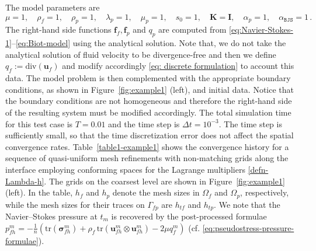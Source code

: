 \documentclass[11pt]{article}
\numberwithin{equation}{section}
\newcommand{\ds}{\displaystyle}
\newcommand{\bgamma}{{\boldsymbol\gamma}}
\newcommand{\bsi}{{\boldsymbol\sigma}}
\newcommand{\bvarphi}{{\boldsymbol\varphi}}
\newcommand{\btau}{{\boldsymbol\tau}}
\newcommand{\bv}{{\mathbf{v}}}
\newcommand{\f}{\mathbf{f}}
\newcommand{\bu}{\mathbf{u}}
\newcommand{\bn}{{\mathbf{n}}}
\newcommand{\0}{{\mathbf{0}}}
\def\bK{\mathbf{K}}
\def\bI{\mathbf{I}}
\def\bV{\mathbf{V}}
\newcommand\bbX{\mathbb{X}}
\def\BJS{\mathtt{BJS}}
\def\tr{\mathrm{tr}}
\def\div{\mathrm{div}}
\def\sk{\mathrm{sk}}
\numberwithin{equation}{section}
\begin{document}
The model parameters are
%
$$
\mu = 1, \quad \rho_f = 1,  \quad \rho_p = 1, \quad \lambda_p = 1, \quad \mu_p = 1, \quad s_0 = 1, \quad \bK = \bI, \quad \alpha_p = 1, \quad \alpha_{\BJS} = 1\,.
$$
%
The right-hand side functions $\f_f, \f_p$ and $q_p$ are computed from \eqref{eq:Navier-Stokes-1}--\eqref{eq:Biot-model} using the analytical solution. 
Note that, we do not take the analytical solution of fluid velocity to be divergence-free and then we define $q_f:= \div(\bu_f)$ and modify accordingly \eqref{eq: discrete formulation} to account this data. 
The model problem is then complemented with the appropriate boundary conditions, as shown in Figure~\ref{fig:example1} (left), and initial data.
Notice that the boundary conditions are not homogeneous and therefore the right-hand side of the resulting system must be modified accordingly.
The total simulation time for this test case is $T=0.01$ and the time step is $\Delta t=10^{-3}$. The time step is sufficiently small, so that the time discretization error does not affect the spatial convergence rates.
Table~\ref{table1-example1} shows the convergence history for a sequence of quasi-uniform mesh refinements with non-matching grids along the interface employing conforming spaces for the Lagrange multipliers \eqref{defn-Lambda-h}. The grids on the coarsest level are shown in Figure~\ref{fig:example1} (left). In the table, $h_f$ and $h_p$ denote the mesh sizes in $\Omega_f$ and $\Omega_p$, respectively, while the mesh sizes for their traces on $\Gamma_{fp}$ are $h_{tf}$ and $h_{tp}$. 
We note that the Navier--Stokes pressure at $t_m$ is recovered by the post-processed formulae $\ds p_{fh}^m = -\frac{1}{n} \left( \tr(\bsi_{fh}^m)  + \rho_f\,\tr(\bu_{fh}^m\otimes\bu_{fh}^m) - 2\mu q_f^m \right)$ (cf. \eqref{eq:pseudostress-pressure-formulae}).
\end{document}
